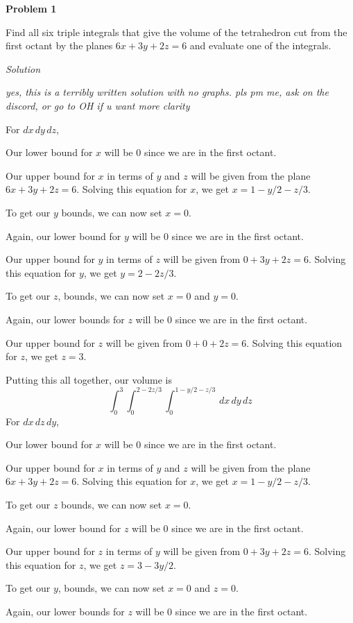 \documentclass{article}
\newcommand{\Solution}{\textit{Solution}}
\begin{document}
\textbf{Problem 1}

Find all six triple integrals that give the volume of the tetrahedron cut from the first octant by the planes $6x+3y+2z=6$ and evaluate one of the integrals.

\Solution

\textit{yes, this is a terribly written solution with no graphs. pls pm me, ask on the discord, or go to OH if u want more clarity}

For $dx\,dy\,dz$,

Our lower bound for $x$ will be $0$ since we are in the first octant.

Our upper bound for $x$ in terms of $y$ and $z$ will be given from the plane $6x+3y+2z=6$. Solving this equation for $x$, we get $x=1-y/2-z/3$.

To get our $y$ bounds, we can now set $x=0$. 

Again, our lower bound for $y$ will be $0$ since we are in the first octant.

Our upper bound for $y$ in terms of $z$ will be given from $0+3y+2z=6$. Solving this equation for $y$, we get $y=2-2z/3$.

To get our $z$, bounds, we can now set $x=0$ and $y=0$.

Again, our lower bounds for $z$ will be $0$ since we are in the first octant.

Our upper bound for $z$ will be given from $0+0+2z=6$. Solving this equation for $z$, we get $z=3$.

Putting this all together, our volume is
\begin{equation*}
    \int_0^3\int_0^{2-2z/3}\int_0^{1-y/2-z/3}\,dx\,dy\,dz
\end{equation*}
For $dx\,dz\,dy$,

Our lower bound for $x$ will be $0$ since we are in the first octant.

Our upper bound for $x$ in terms of $y$ and $z$ will be given from the plane $6x+3y+2z=6$. Solving this equation for $x$, we get $x=1-y/2-z/3$.

To get our $z$ bounds, we can now set $x=0$. 

Again, our lower bound for $z$ will be $0$ since we are in the first octant.

Our upper bound for $z$ in terms of $y$ will be given from $0+3y+2z=6$. Solving this equation for $z$, we get $z=3-3y/2$.

To get our $y$, bounds, we can now set $x=0$ and $z=0$.

Again, our lower bounds for $z$ will be $0$ since we are in the first octant.
\end{document}
